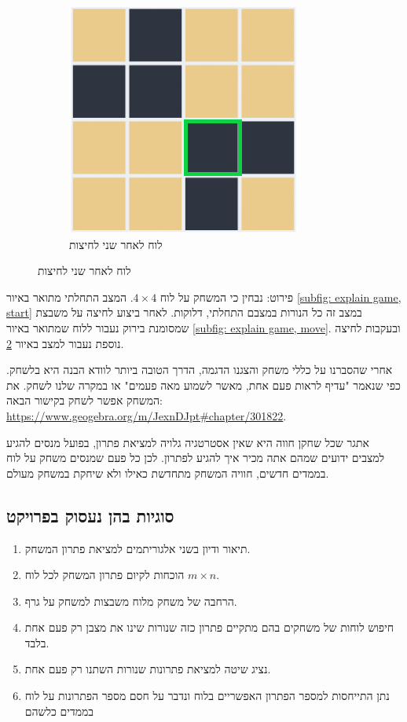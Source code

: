 \documentclass[12pt,leqno]{article}
\theoremstyle{theoremdd}
\begin{document}
\begin{figure}[ht]
\begin{subfigure}{.3\textwidth}
    \end{subfigure}%
    \begin{subfigure}{.3\textwidth}
        \caption{לוח לאחר שני לחיצות}
        \label{subfig: explain game, next move}
        \centering
        \includegraphics[scale=0.67]{images/4x4_next_press.PNG}
    \end{subfigure}%
\end{figure}
פירוט:
נבחין כי המשחק 
על לוח
$4 \times 4$.
המצב התחלתי מתואר
באיור
\ref{subfig: explain game, start}
במצב זה
כל הנורות במצבם התחלתי, דלוקות.
לאחר ביצוע לחיצה על משבצת שמסומנת בירוק נעבור ללוח שמתואר באיור 
\ref{subfig: explain game, move}.
ובעקבות לחיצה נוספת נעבור למצב באיור 
\ref{subfig: explain game, next move}.

אחרי שהסברנו על כללי משחק והצגנו הדגמה, הדרך הטובה ביותר לוודא הבנה היא בלשחק.
כפי שנאמר "עדיף לראות פעם אחת, מאשר לשמוע מאה פעמים"
או במקרה שלנו לשחק.
את המשחק אפשר לשחק בקישור הבאה:
\url{https://www.geogebra.org/m/JexnDJpt#chapter/301822}.

אתגר שכל שחקן חווה היא 
שאין אסטרטגיה גלויה למציאת פתרון, בפועל מנסים להגיע למצבים ידועים
שמהם אתה מכיר איך להגיע לפתרון. 
לכן כל פעם שמנסים משחק על לוח בממדים חדשים, חוויה
המשחק מתחדשת כאילו ולא שיחקת במשחק מעולם.

\subsection{סוגיות בהן נעסוק בפרויקט}
\begin{enumerate}
	\item 
	תיאור ודיון בשני אלגוריתמים למציאת פתרון המשחק.
	\item 
	הוכחות לקיום פתרון המשחק לכל לוח
	$m\times n$.
	\item 
	הרחבה של משחק מלוח משבצות למשחק על גרף.
	\item 
    חיפוש לוחות של משחקים בהם מתקיים פתרון כזה שנורות שינו את מצבן רק פעם אחת בלבד.
    \item 
    נציג שיטה למציאת פתרונות שנורות השתנו רק פעם אחת.
    \item 
    נתן התייחסות למספר הפתרון האפשריים בלוח ונדבר על חסם מספר הפתרונות על לוח בממדים כלשהם
\end{enumerate}
\end{document}

